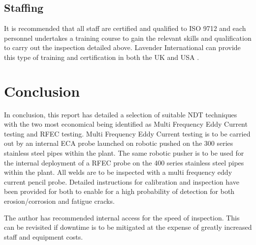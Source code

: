 \documentclass[a4paper,twoside,11pt]{article}
\begin{document}
\subsection{Staffing}
	
It is recommended that all staff are certified and qualified to ISO 9712 \cite{isoISO97122012} and each personnel undertakes a training course to gain the relevant skills and qualification to carry out the inspection detailed above. 
Lavender International can provide this type of training and certification in both the UK and USA \cite{lavenderinternationalLavenderInternationalWorld2019}.

\section{Conclusion}

In conclusion, this report has detailed a selection of suitable NDT techniques with the two most economical being identified as Multi Frequency Eddy Current testing and RFEC testing.
Multi Frequency Eddy Current testing is to be carried out by an internal ECA probe launched on robotic pushed on the 300 series stainless steel pipes within the plant. 
The same robotic pusher is to be used for the internal deployment of a RFEC probe on the 400 series stainless steel pipes within the plant. All welds are to be inspected with a multi frequency eddy current pencil probe.
Detailed instructions for calibration and inspection have been provided for both to enable for a high probability of detection for both erosion/corrosion and fatigue cracks.

The author has recommended internal access for the speed of inspection. This can be revisited if downtime is to be mitigated at the expense of greatly increased staff and equipment costs.


\newpage
{}
\printbibliography
\end{document}
